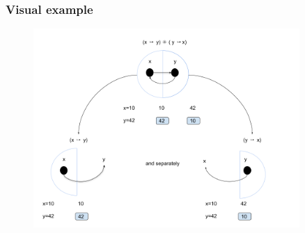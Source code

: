 \documentclass[professionalfont]{beamer}
\begin{document}
    \begin{frame}
        \frametitle{Visual example}
        \begin{figure}
        \includegraphics[width=0.9\textwidth]{img/ex1.png}
        \end{figure}
       

    \end{frame}
\end{document}
